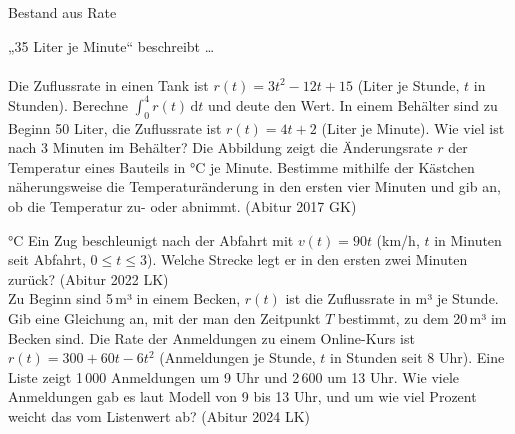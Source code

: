 \setcounter{aufgabe}{7}

\begin{aufgabe}{Bestand aus Rate}
\begin{teile}
\teil „35 Liter je Minute“ beschreibt … \\  \\ 
\teil Die Zuflussrate in einen Tank ist $r(t) = 3t^2 - 12t + 15$ (Liter je Stunde, $t$ in Stunden). Berechne $∫_0^4 r(t)\,\mathrm{d}t$ und deute den Wert. \leerfeld
\teil In einem Behälter sind zu Beginn 50 Liter, die Zuflussrate ist $r(t) = 4t + 2$ (Liter je Minute). Wie viel ist nach 3 Minuten im Behälter? \leerfeld[l]
\teil Die Abbildung zeigt die Änderungsrate $r$ der Temperatur eines Bauteils in °C je Minute. Bestimme mithilfe der Kästchen näherungsweise die Temperaturänderung in den ersten vier Minuten und gib an, ob die Temperatur zu- oder abnimmt. \hfill (Abitur 2017 GK) \\

\begin{ksys}[xmin=0,xmax=6,ymin=-2,ymax=2,xlabel=t,ylabel=r,ablesen]  \end{ksys}
\leerfeld °C
\teil Ein Zug beschleunigt nach der Abfahrt mit $v(t) = 90t$ (km/h, $t$ in Minuten seit Abfahrt, $0 \le t \le 3$). Welche Strecke legt er in den ersten zwei Minuten zurück? \hfill (Abitur 2022 LK) \\ \leerfeld[km]
\teil Zu Beginn sind 5\,m³ in einem Becken, $r(t)$ ist die Zuflussrate in m³ je Stunde. Gib eine Gleichung an, mit der man den Zeitpunkt $T$ bestimmt, zu dem 20\,m³ im Becken sind.
\teil Die Rate der Anmeldungen zu einem Online-Kurs ist $r(t) = 300 + 60t - 6t^2$ (Anmeldungen je Stunde, $t$ in Stunden seit 8 Uhr). Eine Liste zeigt 1\,000 Anmeldungen um 9 Uhr und 2\,600 um 13 Uhr. Wie viele Anmeldungen gab es laut Modell von 9 bis 13 Uhr, und um wie viel Prozent weicht das vom Listenwert ab? \hfill (Abitur 2024 LK)
\end{teile}
\end{aufgabe}

